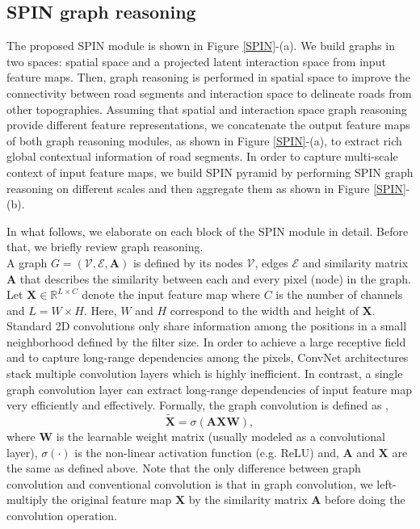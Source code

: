 \documentclass[letterpaper, 10 pt, conference]{ieeeconf}
\begin{document}
\subsection{SPIN graph reasoning}
The proposed SPIN module is shown in Figure \ref{SPIN}-(a). We build
graphs in two spaces: spatial space and a projected latent interaction space from input feature maps. Then, graph reasoning is performed in spatial space to improve the connectivity between road segments and interaction space to delineate roads from other topographies. Assuming that spatial and interaction space graph reasoning provide different feature representations, we concatenate the output feature maps of both graph reasoning modules, as shown in Figure \ref{SPIN}-(a), to extract rich global contextual information of road segments. In order to capture multi-scale context of input feature maps, we build SPIN pyramid by performing SPIN graph reasoning on different scales and then aggregate them  as shown in Figure \ref{SPIN}-(b). 

In what follows, we elaborate on each block of the SPIN module in detail.  Before that, we briefly review graph reasoning.\\
  A graph $G = (\boldsymbol{\mathcal{V}}, \boldsymbol{\mathcal{E}}, \boldsymbol{A})$ is defined by its nodes $\boldsymbol{\mathcal{V}}$, edges $\boldsymbol{\mathcal{E}}$ and similarity matrix $\boldsymbol{A}$ that describes the similarity between each and every pixel (node) in the graph. Let $\boldsymbol{X} \in \mathbb{R}^{L \times C}$ denote the input feature map where  $C$ is the number of channels and $L = W \times H$.  Here, $W$ and $H$ correspond to the width and height of $\boldsymbol{X}$. Standard 2D convolutions only share information among the positions in a small neighborhood defined by the filter size. In order to achieve a large receptive field and to capture long-range dependencies among the pixels, ConvNet architectures stack multiple convolution layers which is highly inefficient. In contrast, a single graph convolution layer can extract long-range dependencies of input feature map very efficiently and effectively. Formally, the graph convolution is defined as \cite{kipf2016semi},
\setlength{\belowdisplayskip}{0pt} \setlength{\belowdisplayshortskip}{0pt}
\setlength{\abovedisplayskip}{0pt} \setlength{\abovedisplayshortskip}{0pt}
\begin{equation}
	\boldsymbol{\tilde{X}} = \sigma \left( \boldsymbol{A} \boldsymbol{X} \boldsymbol{W} \right),
	\label{def_GR}
\end{equation}
where $\boldsymbol{W}$ is the learnable weight matrix (usually modeled as a convolutional layer), $\sigma(\cdot)$ is the non-linear activation function (e.g. ReLU) and, $\boldsymbol{A}$ and $\boldsymbol{X}$ are the same as defined above. Note that the only difference between graph convolution and conventional convolution is that in graph convolution, we left-multiply the original feature map  $\boldsymbol{X}$ by the similarity matrix  $\boldsymbol{A}$ before doing the convolution operation. 
\end{document}
